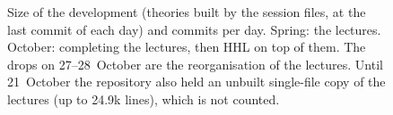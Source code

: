 \begin{figure}[t]
\caption{Size of the development (theories built by the session files, at the last commit of each day)
and commits per day. Spring: the lectures. October: completing the lectures, then HHL on top of them.
The drops on 27--28~October are the reorganisation of the lectures. Until 21~October the repository
also held an unbuilt single-file copy of the lectures (up to 24.9k lines), which is not counted.}\label{fig:timeline}
\end{figure}

